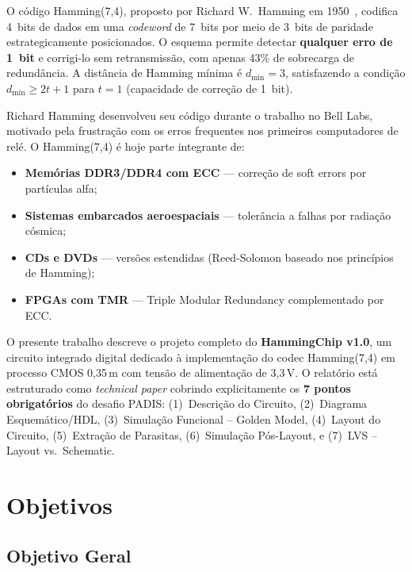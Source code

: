 \documentclass[12pt,a4paper]{article}
\begin{document}
O código Hamming(7,4), proposto por Richard W.\ Hamming em 1950~\cite{hamming1950}, codifica 4~bits de dados em uma \textit{codeword} de 7~bits por meio de 3~bits de paridade estrategicamente posicionados. O esquema permite detectar \textbf{qualquer erro de 1~bit} e corrigi-lo sem retransmissão, com apenas 43\% de sobrecarga de redundância. A distância de Hamming mínima é $d_{\min}=3$, satisfazendo a condição $d_{\min} \geq 2t+1$ para $t=1$ (capacidade de correção de 1~bit).

\begin{unidadebox}
Richard Hamming desenvolveu seu código durante o trabalho no Bell Labs, motivado pela frustração com os erros frequentes nos primeiros computadores de relé. O Hamming(7,4) é hoje parte integrante de:
\begin{itemize}[leftmargin=1.5em]
  \item \textbf{Memórias DDR3/DDR4 com ECC} --- correção de soft errors por partículas alfa;
  \item \textbf{Sistemas embarcados aeroespaciais} --- tolerância a falhas por radiação cósmica;
  \item \textbf{CDs e DVDs} --- versões estendidas (Reed-Solomon baseado nos princípios de Hamming);
  \item \textbf{FPGAs com TMR} --- Triple Modular Redundancy complementado por ECC.
\end{itemize}
\end{unidadebox}

O presente trabalho descreve o projeto completo do \textbf{HammingChip v1.0}, um circuito integrado digital dedicado à implementação do codec Hamming(7,4) em processo CMOS 0,35\,\textmu m com tensão de alimentação de 3,3\,V. O relatório está estruturado como \textit{technical paper} cobrindo explicitamente os \textbf{7 pontos obrigatórios} do desafio PADIS: (1)~Descrição do Circuito, (2)~Diagrama Esquemático/HDL, (3)~Simulação Funcional -- Golden Model, (4)~Layout do Circuito, (5)~Extração de Parasitas, (6)~Simulação Pós-Layout, e (7)~LVS -- Layout vs.\ Schematic.

\section{Objetivos}

\subsection{Objetivo Geral}
\end{document}
